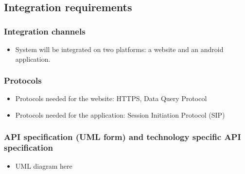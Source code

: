 \documentclass[11pt]{article}
\begin{document}
	\subsection{Integration requirements}
	
	\subsubsection{Integration channels}
	\begin{itemize}
		\item System will be integrated on two platforms: a website and an android application.
	\end{itemize}
	
	\subsubsection{Protocols}
	\begin{itemize}
		\item Protocols needed for the website:  HTTPS, Data Query Protocol
		\item Protocols needed for the application: Session Initiation Protocol (SIP)
	\end{itemize}
	
	\subsubsection{API specification (UML form) and technology specific API specification}
	\begin{itemize}
		\item UML diagram here
	\end{itemize}
	
\end{document}
